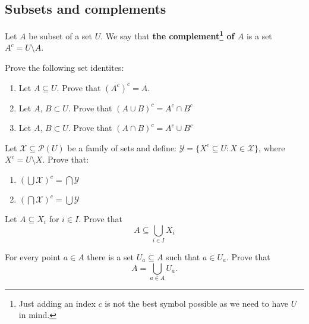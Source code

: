 \subsection{Subsets and complements}
\begin{definition}
  Let $A$ be subset of a set $U$. We say that \textbf{the complement\footnote{Just adding an index $c$ is not the best symbol possible as we need to have $U$ in mind.}
  of $A$} is a set $A^c=U\setminus A$.
\end{definition}


\begin{prob}
	Prove the following set identites:
	\begin{enumerate}
		\item Let $A\subseteq U.$ Prove that $(A^c)^c = A$.
		\item Let $A,\, B\subset U$. Prove that $(A\cup B)^c = A^c\cap B^c$
		\item Let $A,\, B\subset U$. Prove that $(A\cap B)^c = A^c\cup B^c$
	\end{enumerate}
\end{prob}

\begin{prob}
	Let $\mathcal X \subseteq \mathcal P(U)$ be a family of sets and define:
  $\mathcal Y=\{X^c\subseteq U : X\in \mathcal X\}$, where $X^c=U\setminus X$.
  Prove that:
  \begin{enumerate}
    \item $(\bigcup \mathcal X)^c = \bigcap \mathcal Y$
    \item $(\bigcap \mathcal X)^c = \bigcup \mathcal Y$
  \end{enumerate}
\end{prob}

\begin{exercise}
	Let $A\subseteq X_i$ for $i\in I$. Prove that
	$$A\subseteq \bigcup_{i\in I} X_i$$
\end{exercise}

\begin{exercise}
	For every point $a\in A$ there is a set $U_a\subseteq A$ such that $a\in U_a$.
	Prove that $$A=\bigcup_{a\in A} U_a.$$
\end{exercise}

